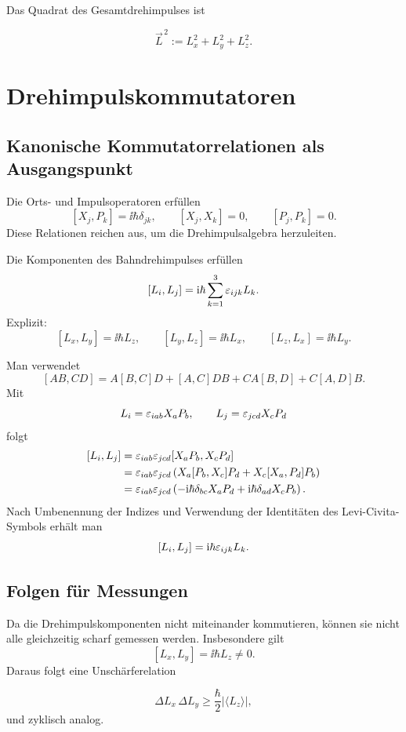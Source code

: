 Das Quadrat des Gesamtdrehimpulses ist
\begin{definitionbox}
\[
    \vec L^{\,2}:=L_x^2+L_y^2+L_z^2.
\]
\end{definitionbox}

\section{Drehimpulskommutatoren}

\subsection{Kanonische Kommutatorrelationen als Ausgangspunkt}

Die Orts- und Impulsoperatoren erfüllen
\[
    [X_j,P_k]=\ii\hbar\delta_{jk},
    \qquad
    [X_j,X_k]=0,
    \qquad
    [P_j,P_k]=0.
\]
Diese Relationen reichen aus, um die Drehimpulsalgebra herzuleiten.

\begin{satzbox}
Die Komponenten des Bahndrehimpulses erfüllen
\[
    [L_i,L_j]=\mathrm{i}\hbar\sum_{k=1}^3\varepsilon_{ijk}L_k.
\]
Explizit:
\[
    [L_x,L_y]=\ii\hbar L_z,
    \qquad
    [L_y,L_z]=\ii\hbar L_x,
    \qquad
    [L_z,L_x]=\ii\hbar L_y.
\]
\end{satzbox}

\begin{proofbox}
Man verwendet
\[
    [AB,CD]=A[B,C]D+[A,C]DB+CA[B,D]+C[A,D]B.
\]
Mit
\[
    L_i=\varepsilon_{iab}X_aP_b,
    \qquad
    L_j=\varepsilon_{jcd}X_cP_d
\]
folgt
\[
\begin{aligned}
    [L_i,L_j]
    &=\eps_{iab}\eps_{jcd}[X_aP_b,X_cP_d]\\
    &=\eps_{iab}\eps_{jcd}\left(X_a[P_b,X_c]P_d+X_c[X_a,P_d]P_b\right)\\
    &=\eps_{iab}\eps_{jcd}\left(-\ii\hbar\delta_{bc}X_aP_d+\ii\hbar\delta_{ad}X_cP_b\right).
\end{aligned}
\]
Nach Umbenennung der Indizes und Verwendung der Identitäten des Levi-Civita-Symbols erhält man
\[
    [L_i,L_j]=\mathrm{i}\hbar\varepsilon_{ijk}L_k.
\]
\end{proofbox}

\subsection{Folgen für Messungen}

Da die Drehimpulskomponenten nicht miteinander kommutieren, können sie nicht alle gleichzeitig scharf gemessen werden. Insbesondere gilt
\[
    [L_x,L_y]=\ii\hbar L_z\neq 0.
\]
Daraus folgt eine Unschärferelation
\begin{formulabox}
\[
    \Delta L_x\,\Delta L_y\geq \frac{\hbar}{2}|\langle L_z\rangle|,
\]
und zyklisch analog.
\end{formulabox}

